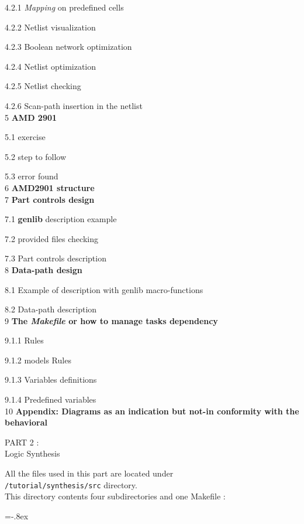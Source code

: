 \documentclass[12pt]{article}
\begin{document}
{\hspace{0.5cm} {4.2.1} {\it Mapping} on predefined cells

\hspace{0.5cm} {4.2.2} Netlist visualization

\hspace{0.5cm} {4.2.3} Boolean network optimization

\hspace{0.5cm} {4.2.4} Netlist optimization 

\hspace{0.5cm} {4.2.5} Netlist checking

\hspace{0.5cm} {4.2.6} Scan-path insertion in the netlist
\\
 {5} {\bf AMD 2901}

 {5.1} exercise

 {5.2} step to follow

 {5.3} error found
\\
 {6} {\bf AMD2901 structure}
\\
 {7} {\bf Part controls design }

 {7.1}{ \bf genlib } description example 

 {7.2} provided files checking

 {7.3} Part controls description
\\
 {8} {\bf Data-path design}

 {8.1} Example of description with genlib macro-functions

 {8.2} Data-path description
\\
{9} {\bf The { \it Makefile } or how to manage tasks dependency }

 {9.1.1} Rules

 {9.1.2} models Rules

 {9.1.3} Variables definitions 

 {9.1.4} Predefined variables
\\
 {10} {\bf Appendix: Diagrams as an indication but not-in conformity with the behavioral}


\newpage
       {\huge
        PART 2 :\\ }
        \vspace{1cm}
        {\huge
        Logic Synthesis
        }

All the files used in this part are located under \\
\texttt{/tutorial/synthesis/src} directory.\\
This directory contents four subdirectories and one Makefile :
\begin{itemize}\itemsep=-.8ex


\end{itemize}}
\end{document}
